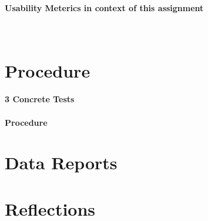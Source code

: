 \documentclass[12pt, onesided, letterpaper]{report}
\begin{document}
\paragraph*{Usability Meterics in context of this assignment}~\\
 

\pagebreak
\pagebreak
\section*{Procedure}

\paragraph*{3 Concrete Tests}

\paragraph*{Procedure}


\pagebreak

\section*{Data Reports}


\section*{Reflections}
\end{document}
